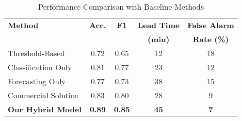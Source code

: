 \begin{table}[h]
\caption{Performance Comparison with Baseline Methods}
\label{table:baseline}
\begin{center}
\begin{tabular}{|l|c|c|c|c|}
\hline
\textbf{Method} & \textbf{Acc.} & \textbf{F1} & \textbf{Lead Time} & \textbf{False Alarm} \\
\textbf{} & \textbf{} & \textbf{} & \textbf{(min)} & \textbf{Rate (\%)} \\
\hline
Threshold-Based & 0.72 & 0.65 & 12 & 18 \\
\hline
Classification Only & 0.81 & 0.77 & 23 & 12 \\
\hline
Forecasting Only & 0.77 & 0.73 & 38 & 15 \\
\hline
Commercial Solution & 0.83 & 0.80 & 28 & 9 \\
\hline
\textbf{Our Hybrid Model} & \textbf{0.89} & \textbf{0.85} & \textbf{45} & \textbf{7} \\
\hline
\end{tabular}
\end{center}
\end{table}